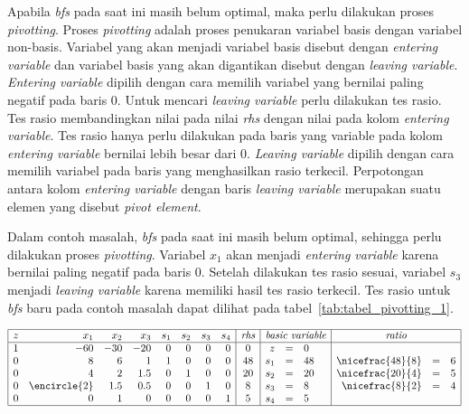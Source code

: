 Apabila \textit{bfs} pada saat ini masih belum optimal, maka perlu dilakukan proses \textit{pivotting}. Proses \textit{pivotting} adalah proses penukaran variabel basis dengan variabel non-basis. Variabel yang akan menjadi variabel basis disebut dengan \textit{entering variable} dan variabel basis yang akan digantikan disebut dengan \textit{leaving variable}. \textit{Entering variable} dipilih dengan cara memilih variabel yang bernilai paling negatif pada baris 0. Untuk mencari \textit{leaving variable} perlu dilakukan tes rasio. Tes rasio membandingkan nilai pada nilai \textit{rhs} dengan nilai pada kolom \textit{entering variable}. Tes rasio hanya perlu dilakukan pada baris yang variable pada kolom \textit{entering variable} bernilai lebih besar dari 0. \textit{Leaving variable} dipilih dengan cara memilih variabel pada baris yang menghasilkan rasio terkecil. Perpotongan antara kolom \textit{entering variable} dengan baris \textit{leaving variable} merupakan suatu elemen yang disebut \textit{pivot element}.

Dalam contoh masalah, \textit{bfs} pada saat ini masih belum optimal, sehingga perlu dilakukan proses \textit{pivotting}. Variabel \(x_1\) akan menjadi \textit{entering variable} karena bernilai paling negatif pada baris 0. Setelah dilakukan tes rasio sesuai, variabel \(s_3\) menjadi \textit{leaving variable} karena memiliki hasil tes rasio terkecil. Tes rasio untuk \textit{bfs} baru pada contoh masalah dapat dilihat pada tabel~\ref{tab:tabel_pivotting_1}.

\begin{center}
	\label{tab:tabel_pivotting_1}
	$
	\begin{array}{|r r r r r r r r|c|r c l|r c l|}
		\hline
		z & x_1 & x_2 & x_3 & s_1 & s_2 & s_3 & s_4 & \textit{rhs} & \multicolumn{3}{c|}{\textit{basic variable}} & \multicolumn{3}{c|}{\textit{ratio}}\\
		\hline
		1 & -60 & -30 & -20 & 0 & 0 & 0 & 0 & 0 & z & = & 0 &&&\\
		0 & 8 & 6 & 1 & 1 & 0 & 0 & 0 & 48 & s_1 & = & 48 & \nicefrac{48}{8} & = & 6\\
		0 & 4 & 2 & 1.5 & 0 & 1 & 0 & 0 & 20 & s_2 & = & 20 & \nicefrac{20}{4} & = & 5\\
		0 & \encircle{2} & 1.5 & 0.5 & 0 & 0 & 1 & 0 & 8 & s_3 & = & 8 & \nicefrac{8}{2} & = & 4\\
		0 & 0 & 1 & 0 & 0 & 0 & 0 & 1 & 5 & s_4 & = & 5 &&&\\
		\hline
	\end{array}
	$
\end{center}

